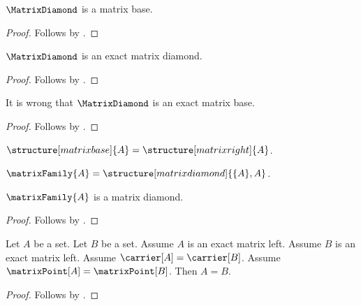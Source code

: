 \begin{proposition}\label{matrix_diamond_is_open_base}
    $\MatrixDiamond$ is a matrix base.
\end{proposition}
\begin{proof}
    Follows by .
\end{proof}

\begin{proposition}\label{matrix_diamond_is_exact_diamond}
    $\MatrixDiamond$ is an exact matrix diamond.
\end{proposition}
\begin{proof}
    Follows by
    .
\end{proof}

\begin{proposition}\label{matrix_diamond_is_not_exact_base}
    It is wrong that $\MatrixDiamond$ is an exact matrix base.
\end{proposition}
\begin{proof}
    Follows by
    .
\end{proof}

\begin{proposition}\label{matrix_annotation_is_not_a_tag}
    $\structure[matrix base]{A}=\structure[matrix right]{A}$.
\end{proposition}

\begin{definition}\label{matrix_family}
    $\matrixFamily{A}=\structure[matrix diamond]{\{A\},A}$.
\end{definition}

\begin{proposition}\label{matrix_family_is_diamond}
    $\matrixFamily{A}$ is a matrix diamond.
\end{proposition}
\begin{proof}
    Follows by .
\end{proof}

\begin{proposition}\label{exact_matrix_left_extensionality}
    Let $A$ be a set.
    Let $B$ be a set.
    Assume $A$ is an exact matrix left.
    Assume $B$ is an exact matrix left.
    Assume $\carrier[A]=\carrier[B]$.
    Assume $\matrixPoint[A]=\matrixPoint[B]$.
    Then $A=B$.
\end{proposition}
\begin{proof}
    Follows by .
\end{proof}
